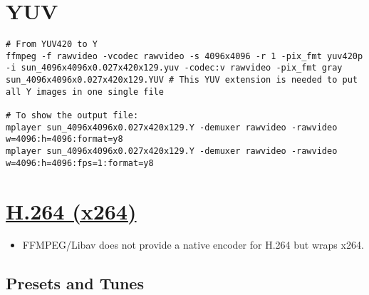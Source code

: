 
\section{YUV}

\begin{verbatim}
# From YUV420 to Y
ffmpeg -f rawvideo -vcodec rawvideo -s 4096x4096 -r 1 -pix_fmt yuv420p -i sun_4096x4096x0.027x420x129.yuv -codec:v rawvideo -pix_fmt gray sun_4096x4096x0.027x420x129.YUV # This YUV extension is needed to put all Y images in one single file

# To show the output file:
mplayer sun_4096x4096x0.027x420x129.Y -demuxer rawvideo -rawvideo w=4096:h=4096:format=y8
mplayer sun_4096x4096x0.027x420x129.Y -demuxer rawvideo -rawvideo w=4096:h=4096:fps=1:format=y8
\end{verbatim}



\section{\href{http://www.videolan.org/developers/x264.html}{H.264 (x264)}}

\begin{itemize}
\item FFMPEG/Libav does not provide a native encoder for H.264 but wraps x264.
\end{itemize}

\subsection{Presets and Tunes}


